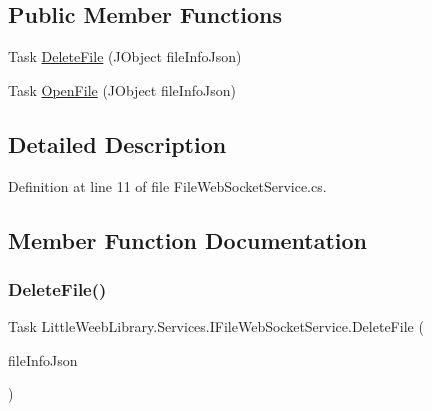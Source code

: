 \subsection*{Public Member Functions}
\begin{DoxyCompactItemize}
\item 
Task \mbox{\hyperlink{interface_little_weeb_library_1_1_services_1_1_i_file_web_socket_service_a1d612036848a98701a908e3054d8001f}{Delete\+File}} (J\+Object file\+Info\+Json)
\item 
Task \mbox{\hyperlink{interface_little_weeb_library_1_1_services_1_1_i_file_web_socket_service_a55cfbde72a70fb90c011438a1c415713}{Open\+File}} (J\+Object file\+Info\+Json)
\end{DoxyCompactItemize}


\subsection{Detailed Description}


Definition at line 11 of file File\+Web\+Socket\+Service.\+cs.



\subsection{Member Function Documentation}
\mbox{\label{interface_little_weeb_library_1_1_services_1_1_i_file_web_socket_service_a1d612036848a98701a908e3054d8001f}} 
\subsubsection{\texorpdfstring{Delete\+File()}{DeleteFile()}}
{\footnotesize\ttfamily Task Little\+Weeb\+Library.\+Services.\+I\+File\+Web\+Socket\+Service.\+Delete\+File (\begin{DoxyParamCaption}\item[{J\+Object}]{file\+Info\+Json }\end{DoxyParamCaption})}



